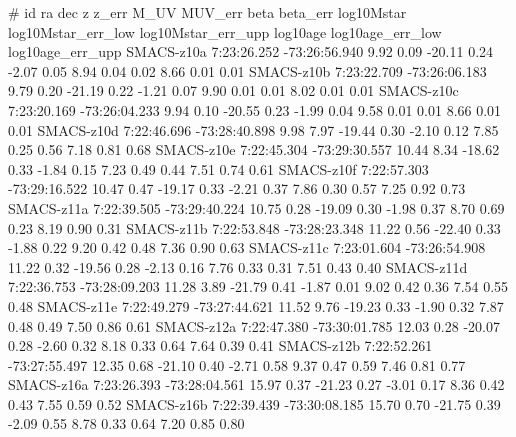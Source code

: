 # id ra dec z z_err M_UV MUV_err beta beta_err log10Mstar log10Mstar_err_low log10Mstar_err_upp log10age log10age_err_low log10age_err_upp
SMACS-z10a   7:23:26.252   -73:26:56.940   9.92 0.09     -20.11   0.24   -2.07 0.05   8.94 0.04 0.02    8.66 0.01 0.01
SMACS-z10b   7:23:22.709   -73:26:06.183   9.79 0.20     -21.19   0.22   -1.21 0.07   9.90 0.01 0.01    8.02 0.01 0.01
SMACS-z10c   7:23:20.169   -73:26:04.233   9.94 0.10     -20.55   0.23   -1.99 0.04   9.58 0.01 0.01    8.66 0.01 0.01
SMACS-z10d   7:22:46.696   -73:28:40.898   9.98 7.97     -19.44   0.30   -2.10 0.12   7.85 0.25 0.56    7.18 0.81 0.68
SMACS-z10e   7:22:45.304   -73:29:30.557   10.44 8.34    -18.62   0.33   -1.84 0.15   7.23 0.49 0.44    7.51 0.74 0.61
SMACS-z10f   7:22:57.303   -73:29:16.522   10.47 0.47    -19.17   0.33   -2.21 0.37   7.86 0.30 0.57    7.25 0.92 0.73
SMACS-z11a   7:22:39.505   -73:29:40.224   10.75 0.28    -19.09   0.30   -1.98 0.37   8.70 0.69 0.23    8.19 0.90 0.31
SMACS-z11b   7:22:53.848   -73:28:23.348   11.22 0.56    -22.40   0.33   -1.88 0.22   9.20 0.42 0.48    7.36 0.90 0.63
SMACS-z11c   7:23:01.604   -73:26:54.908   11.22 0.32    -19.56   0.28   -2.13 0.16   7.76 0.33 0.31    7.51 0.43 0.40
SMACS-z11d   7:22:36.753   -73:28:09.203   11.28 3.89    -21.79   0.41   -1.87 0.01   9.02 0.42 0.36    7.54 0.55 0.48
SMACS-z11e   7:22:49.279   -73:27:44.621   11.52 9.76    -19.23   0.33   -1.90 0.32   7.87 0.48 0.49    7.50 0.86 0.61
SMACS-z12a   7:22:47.380   -73:30:01.785   12.03 0.28    -20.07   0.28   -2.60 0.32   8.18 0.33 0.64    7.64 0.39 0.41
SMACS-z12b   7:22:52.261   -73:27:55.497   12.35 0.68    -21.10   0.40   -2.71 0.58   9.37 0.47 0.59    7.46 0.81 0.77
SMACS-z16a   7:23:26.393   -73:28:04.561   15.97 0.37    -21.23   0.27   -3.01 0.17   8.36 0.42 0.43    7.55 0.59 0.52
SMACS-z16b   7:22:39.439   -73:30:08.185   15.70 0.70    -21.75   0.39   -2.09 0.55   8.78 0.33 0.64    7.20 0.85 0.80
